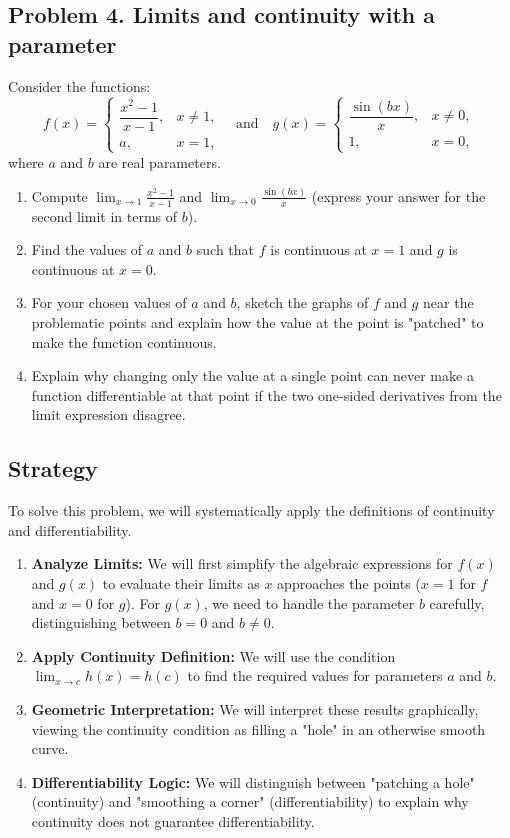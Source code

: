\subsection{Problem 4. Limits and continuity with a parameter}
Consider the functions:
\[ f(x)=\begin{cases}\dfrac{x^{2}-1}{x-1},&x\ne1,\\ a,&x=1,\end{cases} \quad \text{and} \quad g(x)=\begin{cases}\dfrac{\sin(bx)}{x},&x\ne0,\\ 1,&x=0,\end{cases} \]
where $a$ and $b$ are real parameters.

\begin{enumerate}[label=(\alph*)]
    \item Compute $\displaystyle\lim_{x\rightarrow1}\frac{x^{2}-1}{x-1}$ and $\displaystyle\lim_{x\rightarrow0}\frac{\sin(bx)}{x}$ (express your answer for the second limit in terms of $b$).
    \item Find the values of $a$ and $b$ such that $f$ is continuous at $x=1$ and $g$ is continuous at $x=0$.
    \item For your chosen values of $a$ and $b$, sketch the graphs of $f$ and $g$ near the problematic points and explain how the value at the point is "patched" to make the function continuous.
    \item Explain why changing only the value at a single point can never make a function differentiable at that point if the two one-sided derivatives from the limit expression disagree.
\end{enumerate}

\subsection*{Strategy}
To solve this problem, we will systematically apply the definitions of continuity and differentiability.
\begin{enumerate}[label=(\alph*)]
    \item \textbf{Analyze Limits:} We will first simplify the algebraic expressions for $f(x)$ and $g(x)$ to evaluate their limits as $x$ approaches the points ($x=1$ for $f$ and $x=0$ for $g$). For $g(x)$, we need to handle the parameter $b$ carefully, distinguishing between $b=0$ and $b \neq 0$.
    \item \textbf{Apply Continuity Definition:} We will use the condition $\lim_{x \to c} h(x) = h(c)$ to find the required values for parameters $a$ and $b$.
    \item \textbf{Geometric Interpretation:} We will interpret these results graphically, viewing the continuity condition as filling a "hole" in an otherwise smooth curve.
    \item \textbf{Differentiability Logic:} We will distinguish between "patching a hole" (continuity) and "smoothing a corner" (differentiability) to explain why continuity does not guarantee differentiability.
\end{enumerate}

